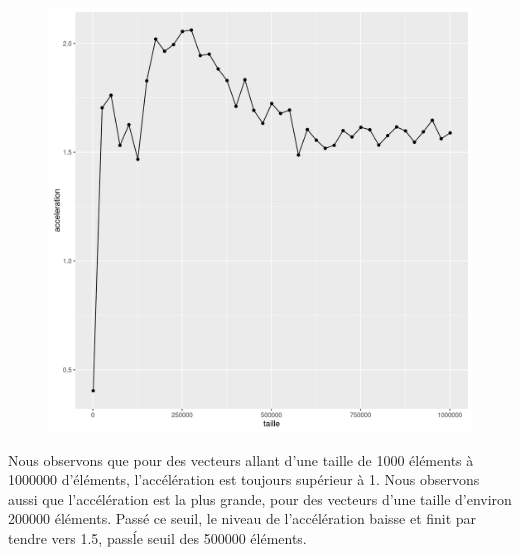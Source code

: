 \documentclass[a4paper,11pt]{scrartcl}
\begin{document}
\begin{figure}[H] \center
   \includegraphics[scale=0.5] {graphes/global_temps_machine_accel7.png}
\end{figure}

Nous observons que pour des vecteurs allant d'une taille de 1000 \'el\'ements \`a 1000000 d'\'el\'ements, l'acc\'el\'eration est toujours sup\'erieur \`a 1. Nous observons aussi que l'acc\'el\'eration est la plus grande, pour des vecteurs d'une taille d'environ 200000 \'el\'ements. Pass\'e ce seuil, le niveau de l'acc\'el\'eration baisse et finit par tendre vers 1.5, pass\' le seuil des 500000 \'el\'ements.   
\end{document}
